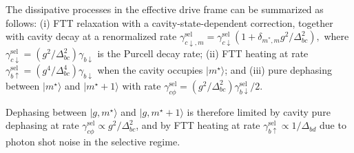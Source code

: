 The dissipative processes in the effective drive frame can be summarized as follows:
(i) FTT relaxation with a cavity-state-dependent correction, together with cavity decay at a renormalized rate
\(
\gamma_{c\downarrow,m}^{\mathrm{sel}}
= \gamma_{c\downarrow}^{\mathrm{sel}}\left(1 + \delta_{m^*,m} g^2/\Delta_{bc}^2 \right),
\)
where
\(
\gamma_{c\downarrow}^{\mathrm{sel}} = (g^2/\Delta_{bc}^2)\gamma_{b\downarrow} 
\)
is the Purcell decay rate;
(ii) FTT heating at rate
\(
\gamma_{b\uparrow}^{\mathrm{sel}} = (g^4/\Delta_{bc}^4)\gamma_{b\downarrow}
\)
when the cavity occupies \(|m^\star\rangle\);
and (iii) pure dephasing between \(|m^\star\rangle\) and \(|m^\star+1\rangle\) with rate
\(
\gamma_{c\phi}^{\mathrm{sel}} = (g^2/\Delta_{bc}^2)\gamma_{b\downarrow}^{\mathrm{sel}}/2.
\)

Dephasing between \(|g,m^\star\rangle\) and \(|g,m^\star+1\rangle\) is therefore limited by cavity pure dephasing at rate \(\gamma_{c\phi}^{\mathrm{sel}}\propto g^2/\Delta_{bc}^2\), and by FTT heating at rate \(\gamma_{b\uparrow}^{\mathrm{sel}}\propto 1/\Delta_{bd}\) due to photon shot noise in the selective regime.

